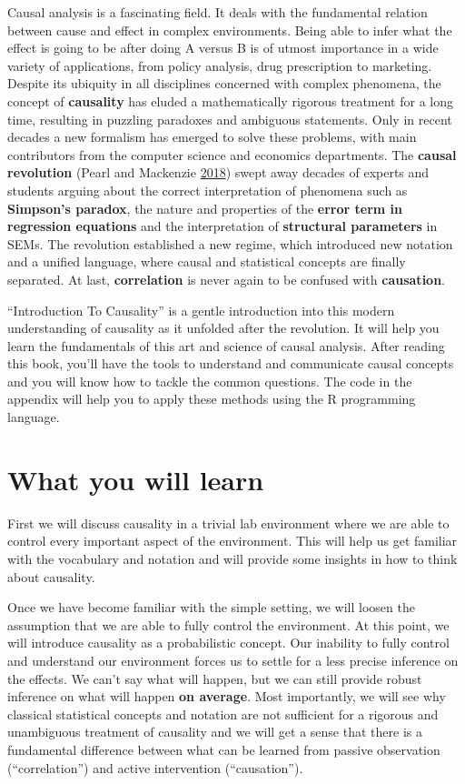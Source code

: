 \documentclass[
]{book}
\theoremstyle{definition}
\theoremstyle{definition}
\theoremstyle{definition}
\theoremstyle{remark}
\begin{document}
Causal analysis is a fascinating field. It deals with the fundamental relation between cause and effect in complex environments. Being able to infer what the effect is going to be after doing A versus B is of utmost importance in a wide variety of applications, from policy analysis, drug prescription to marketing. Despite its ubiquity in all disciplines concerned with complex phenomena, the concept of \textbf{causality} has eluded a mathematically rigorous treatment for a long time, resulting in puzzling paradoxes and ambiguous statements. Only in recent decades a new formalism has emerged to solve these problems, with main contributors from the computer science and economics departments. The \textbf{causal revolution} (Pearl and Mackenzie \protect\hyperlink{ref-pearl2019}{2018}) swept away decades of experts and students arguing about the correct interpretation of phenomena such as \textbf{Simpson's paradox}, the nature and properties of the \textbf{error term in regression equations} and the interpretation of \textbf{structural parameters} in SEMs. The revolution established a new regime, which introduced new notation and a unified language, where causal and statistical concepts are finally separated. At last, \textbf{correlation} is never again to be confused with \textbf{causation}.

``Introduction To Causality'' is a gentle introduction into this modern understanding of causality as it unfolded after the revolution. It will help you learn the fundamentals of this art and science of causal analysis. After reading this book, you'll have the tools to understand and communicate causal concepts and you will know how to tackle the common questions. The code in the appendix will help you to apply these methods using the R programming language.

\hypertarget{what-you-will-learn}{%
\section{What you will learn}\label{what-you-will-learn}}

First we will discuss causality in a trivial lab environment where we are able to control every important aspect of the environment. This will help us get familiar with the vocabulary and notation and will provide some insights in how to think about causality.

Once we have become familiar with the simple setting, we will loosen the assumption that we are able to fully control the environment. At this point, we will introduce causality as a probabilistic concept. Our inability to fully control and understand our environment forces us to settle for a less precise inference on the effects. We can't say what will happen, but we can still provide robust inference on what will happen \textbf{on average}. Most importantly, we will see why classical statistical concepts and notation are not sufficient for a rigorous and unambiguous treatment of causality and we will get a sense that there is a fundamental difference between what can be learned from passive observation (``correlation'') and active intervention (``causation'').
\end{document}
